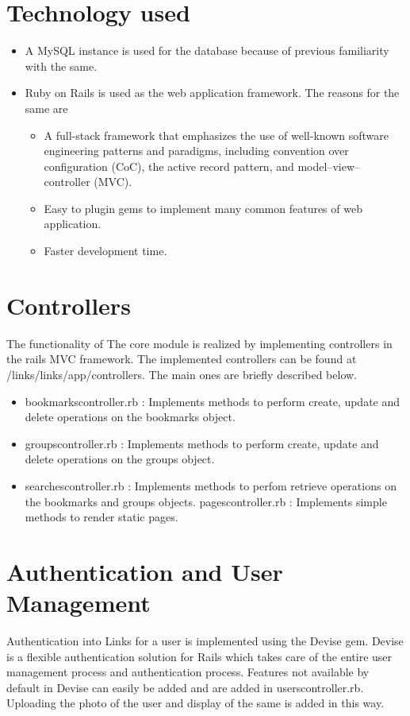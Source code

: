 \documentclass[11pt]{report} %
\begin{document}
\section{Technology used}
\begin{itemize}
\item
A MySQL instance is used for the database because of previous familiarity  with the same.
\item
Ruby on Rails is used as the web application framework. The reasons for the same are
\begin{itemize}
\item
A full-stack framework that emphasizes the use of well-known software engineering patterns and paradigms, including convention over configuration (CoC), the active record pattern, and model–view–controller (MVC).
\item
Easy to plugin gems to implement many common features of web application.
\item
Faster development time.
\end{itemize}
\end{itemize}

\section{Controllers}
The functionality of The core module is realized by implementing controllers in the rails MVC  framework. The implemented controllers can be found at /links/links/app/controllers. The main ones are briefly described below.
\begin{itemize}
\item
bookmarks\textunderscore controller.rb : Implements methods to perform create, update and delete operations on the bookmarks object.
\item
groups\textunderscore controller.rb : Implements methods to perform create, update and delete operations on the groups object.
\item
searches\textunderscore controller.rb : Implements methods to perfom retrieve operations on the bookmarks and groups objects.
pages\textunderscore controller.rb : Implements simple methods to render static pages.
\end{itemize}

\section{Authentication and User Management}
Authentication into Links for a user is implemented using the Devise gem. Devise is a flexible authentication solution for Rails which takes care of the entire user management process and authentication process. Features not available by default in Devise can easily be added and are added in users\textunderscore controller.rb. Uploading the photo of the user and display of the same is added in this way.
\end{document}

